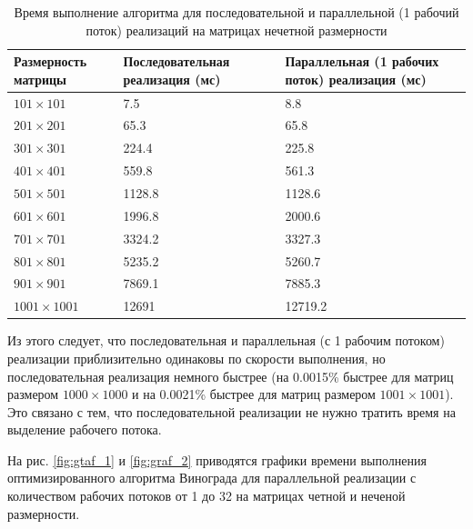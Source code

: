 \documentclass[a4paper,14pt]{article}
\begin{document}
    	 \begin{table} [h!]
    	\begin{center}
    	\caption{Время выполнение алгоритма для последовательной и параллельной (1 рабочий поток) реализаций на матрицах нечетной размерности}
    	\begin{tabular}{|p{5cm}|p{5cm}|p{5cm}|}
    	\hline 
    	Размерность матрицы & Последовательная реализация (мс) & Параллельная (1 рабочих поток) реализация (мс) \\ 
    	\hline 
    	$101 \times 101$ & 7.5 & 8.8 \\ 
    	\hline 
    	$201 \times 201$ & 65.3 & 65.8  \\ 
    	\hline 
    	$301 \times 301$ & 224.4 & 225.8 \\ 
    	\hline 
    	$401 \times 401$ & 559.8 & 561.3 \\ 
    	\hline 
    	$501 \times 501$ & 1128.8 & 1128.6 \\ 
    	\hline 
    	$601 \times 601$ & 1996.8 & 2000.6  \\ 
    	\hline 
    	$701 \times 701$ & 3324.2 & 3327.3  \\ 
    	\hline 
    	$801 \times 801$ & 5235.2 & 5260.7 \\ 
    	\hline 
    	$901 \times 901$ & 7869.1 & 7885.3 \\ 
    	\hline 
    	$1001 \times 1001$ & 12691 & 12719.2 \\ 
    	\hline 
    	\end{tabular} 
    	\label{table:table02}
    	\end{center}
    	\end{table}
    	
    	Из этого следует, что последовательная и параллельная (с 1 рабочим потоком) реализации приблизительно одинаковы по скорости выполнения, но последовательная реализация немного быстрее (на 0.0015\% быстрее для матриц размером $1000 \times 1000$ и на 0.0021\% быстрее для матриц размером $1001 \times 1001$). Это связано с тем, что последовательной реализации не нужно тратить время на выделение рабочего потока.
    	
        На рис. \ref{fig:gtaf_1} и \ref{fig:graf_2} приводятся графики времени выполнения оптимизированного алгоритма Винограда для параллельной реализации с количеством рабочих потоков от 1 до 32 на матрицах четной и неченой размерности.
        
\end{document}
